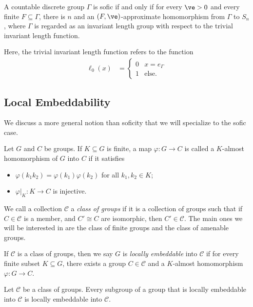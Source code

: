\documentclass[10pt]{mypackage}
\begin{document}
\begin{theorem}
  A countable discrete group $\Gamma$ is sofic if and only if for every $\ve > 0$ and every finite $F\subseteq \Gamma$, there is $n$ and an $\left( F,\ve \right)$-approximate homomorphism from $\Gamma$ to $S_n$, where $\Gamma$ is regarded as an invariant length group with respect to the trivial invariant length function.
\end{theorem}
Here, the trivial invariant length function refers to the function
\begin{align*}
  \ell_0(x) &= \begin{cases}
    0 & x = e_{\Gamma}\\
    1 & \text{else}.
  \end{cases}
\end{align*}
\subsection{Local Embeddability}%
We discuss a more general notion than soficity that we will specialize to the sofic case.
\begin{definition}
  Let $G$ and $C$ be groups. If $K\subseteq G$ is finite, a map $\varphi\colon G\rightarrow C$ is called a $K$-almost homomorphism of $G$ into $C$ if it satisfies
  \begin{itemize}
    \item $\varphi\left( k_1k_2 \right)= \varphi\left( k_1 \right)\varphi\left( k_2 \right)$ for all $k_1,k_2\in K$;
    \item $\varphi|_{K}\colon K\rightarrow C$ is injective.
  \end{itemize}
\end{definition}
We call a collection $\mathcal{C}$ a \textit{class of groups} if it is a collection of groups such that if $C\in \mathcal{C}$ is a member, and $C'\cong C$ are isomorphic, then $C'\in \mathcal{C}$. The main ones we will be interested in are the class of finite groups and the class of amenable groups.
\begin{definition}
  If $\mathcal{C}$ is a class of groups, then we say $G$ is \textit{locally embeddable} into $\mathcal{C}$ if for every finite subset $K\subseteq G$, there exists a group $C\in \mathcal{C}$ and a $K$-almost homomorphism $\varphi\colon G\rightarrow C$.
\end{definition}
\begin{proposition}
  Let $\mathcal{C}$ be a class of groups. Every subgroup of a group that is locally embeddable into $\mathcal{C}$ is locally embeddable into $\mathcal{C}$.
\end{proposition}
\end{document}
